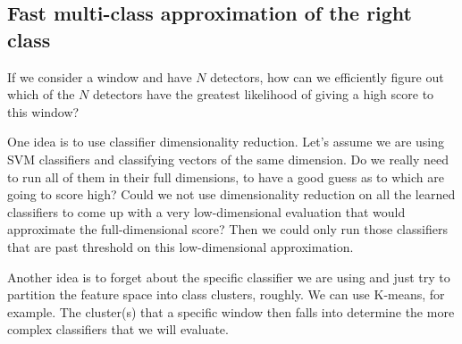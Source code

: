 \subsection{Fast multi-class approximation of the right class} \label{sec:multiclass_approx}
If we consider a window and have $N$ detectors, how can we efficiently figure out which of the $N$ detectors have the greatest likelihood of giving a high score to this window?

One idea is to use classifier dimensionality reduction.
Let's assume we are using SVM classifiers and classifying vectors of the same dimension.
Do we really need to run all of them in their full dimensions, to have a good guess as to which are going to score high?
Could we not use dimensionality reduction on all the learned classifiers to come up with a very low-dimensional evaluation that would approximate the full-dimensional score?
Then we could only run those classifiers that are past threshold on this low-dimensional approximation.

Another idea is to forget about the specific classifier we are using and just try to partition the feature space into class clusters, roughly.
We can use K-means, for example.
The cluster(s) that a specific window then falls into determine the more complex classifiers that we will evaluate.

